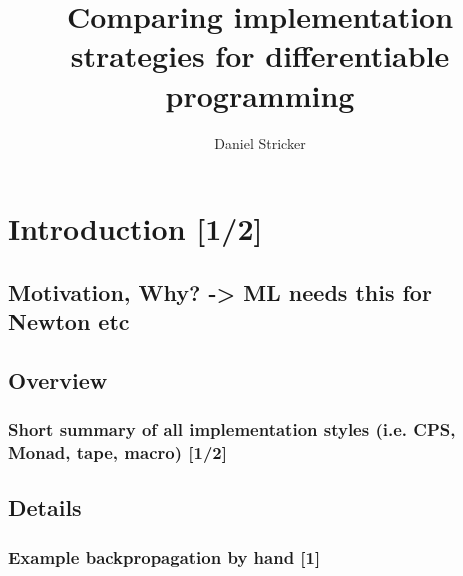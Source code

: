 \documentclass[
	english,
	class=report,custommargins=true,marginpar=false,
	accentcolor=9c,%
	thesis={type=bachelor},%
	fontsize=11pt,%
]{tudapub}
\begin{document}

\title{Comparing implementation strategies for differentiable programming}
\subtitle{}
\author{Daniel Stricker}%

\submissiondate{\today}
\examdate{\today}


\maketitle

\affidavit

% 

\tableofcontents





% 
\chapter{Introduction [1/2]}
\section{Motivation, Why? -> ML needs this for Newton etc}
\section{Overview}
\subsection{Short summary of all implementation styles (i.e. CPS, Monad, tape, macro) [1/2]}
\section{Details}
\subsection{Example backpropagation by hand [1]}
\end{document}
